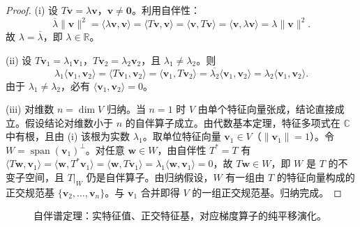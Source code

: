 \begin{proof}
(i) 设 $T\mathbf{v} = \lambda \mathbf{v}$，$\mathbf{v} \neq \mathbf{0}$。利用自伴性：
\[
\overline{\lambda} \|\mathbf{v}\|^2 = \langle \lambda \mathbf{v}, \mathbf{v} \rangle = \langle T\mathbf{v}, \mathbf{v} \rangle = \langle \mathbf{v}, T\mathbf{v} \rangle = \langle \mathbf{v}, \lambda \mathbf{v} \rangle = \lambda \|\mathbf{v}\|^2.
\]
故 $\lambda = \overline{\lambda}$，即 $\lambda \in \mathbb{R}$。

(ii) 设 $T\mathbf{v}_1 = \lambda_1 \mathbf{v}_1$，$T\mathbf{v}_2 = \lambda_2 \mathbf{v}_2$，且 $\lambda_1 \neq \lambda_2$。则
\[
\lambda_1 \langle \mathbf{v}_1, \mathbf{v}_2 \rangle = \langle T\mathbf{v}_1, \mathbf{v}_2 \rangle = \langle \mathbf{v}_1, T\mathbf{v}_2 \rangle = \overline{\lambda_2} \langle \mathbf{v}_1, \mathbf{v}_2 \rangle = \lambda_2 \langle \mathbf{v}_1, \mathbf{v}_2 \rangle.
\]
由于 $\lambda_1 \neq \lambda_2$，必有 $\langle \mathbf{v}_1, \mathbf{v}_2 \rangle = 0$。

(iii) 对维数 $n = \dim V$ 归纳。当 $n=1$ 时 $V$ 由单个特征向量张成，结论直接成立。假设结论对维数小于 $n$ 的自伴算子成立。由代数基本定理，特征多项式在 $\mathbb{C}$ 中有根，且由 (i) 该根为实数 $\lambda_1$。取单位特征向量 $\mathbf{v}_1 \in V$（$\|\mathbf{v}_1\| = 1$）。令 $W = \operatorname{span}(\mathbf{v}_1)^\perp$。对任意 $\mathbf{w} \in W$，由自伴性 $T^* = T$ 有 $\langle T\mathbf{w}, \mathbf{v}_1 \rangle = \langle \mathbf{w}, T^*\mathbf{v}_1 \rangle = \langle \mathbf{w}, T\mathbf{v}_1 \rangle = \lambda_1 \langle \mathbf{w}, \mathbf{v}_1 \rangle = 0$，故 $T\mathbf{w} \in W$，即 $W$ 是 $T$ 的不变子空间，且 $T|_W$ 仍是自伴算子。由归纳假设，$W$ 有一组由 $T$ 的特征向量构成的正交规范基 $\{\mathbf{v}_2, \dots, \mathbf{v}_n\}$。与 $\mathbf{v}_1$ 合并即得 $V$ 的一组正交规范基。归纳完成。
\end{proof}

\begin{figure}[htbp]
\centering
{}
\caption{自伴谱定理：实特征值、正交特征基，对应梯度算子的纯平移演化。}
\label{fig:selfadjoint_spectral}
\end{figure}

